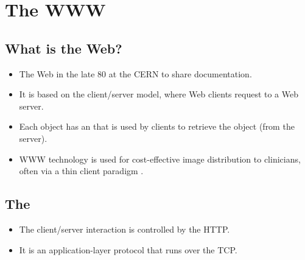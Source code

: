 \chapter{The \gls{WWW}}

\section{What is the Web?}
\begin{itemize}
\item The Web  in the late 80 at the
  \gls{CERN} to share documentation.
\item It is based on the client/server model, where Web clients request
   to a Web server.
\item Each object has an  that
  is used by clients to retrieve the object (from the server).
\item WWW technology is used for cost-effective image distribution to
  clinicians, often via a thin client paradigm
  \cite{bushberg2011essential}.
\end{itemize}

\section{The }
\begin{itemize}
\item The client/server interaction is controlled by the \gls{HTTP}.
\item It is an application-layer protocol that runs over the \gls{TCP}.
\end{itemize}

